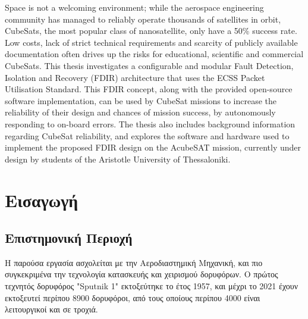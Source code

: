 \documentclass[a4paper,nobib]{tufte-book}
\begin{document}
\justify
Space is not a welcoming environment; while the aerospace engineering community has managed to reliably operate thousands of satellites in orbit, CubeSats, the most popular class of nanosatellite, only have a 50\% success rate. Low costs, lack of strict technical requirements and scarcity of publicly available documentation often drives up the risks for educational, scientific and commercial CubeSats. This thesis investigates a configurable and modular Fault Detection, Isolation and Recovery (FDIR) architecture that uses the ECSS Packet Utilisation Standard. This FDIR concept, along with the provided open-source software implementation, can be used by CubeSat missions to increase the reliability of their design and chances of mission success, by autonomously responding to on-board errors. The thesis also includes background information regarding CubeSat reliability, and explores the software and hardware used to implement the proposed FDIR design on the AcubeSAT mission, currently under design by students of the Aristotle University of Thessaloniki.


\mainmatter


\chapter{Εισαγωγή}





\section{Επιστημονική Περιοχή}

Η παρούσα εργασία ασχολείται με την Αεροδιαστημική Μηχανική, και πιο συγκεκριμένα την τεχνολογία κατασκευής και χειρισμού δορυφόρων. Ο πρώτος τεχνητός δορυφόρος "Sputnik 1" εκτοξεύτηκε το έτος 1957, και μέχρι το 2021 έχουν εκτοξευτεί περίπου \SI{8900}{} δορυφόροι, από τους οποίους περίπου \SI{4000}{} είναι λειτουργικοί και σε τροχιά. \autocite{unionofconcernedscientists_satellite_database_2021,kelso_norad_twoline,wood_visualizing_all_2020}
\end{document}
